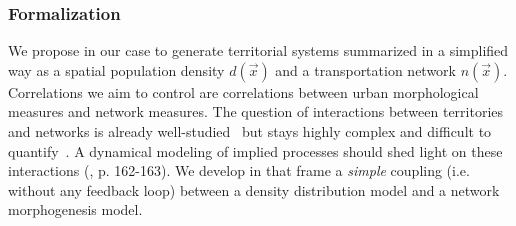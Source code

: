 

\subsubsection{Formalization}

We propose in our case to generate territorial systems summarized in a simplified way as a spatial population density $d(\vec{x})$ and a transportation network $n(\vec{x})$. Correlations we aim to control are correlations between urban morphological measures and network measures. The question of interactions between territories and networks is already well-studied~\cite{offner1996reseaux} but stays highly complex and difficult to quantify~\cite{offner1993effets}. A dynamical modeling of implied processes should shed light on these interactions (\cite{bretagnolle:tel-00459720}, p. 162-163). We develop in that frame a \emph{simple} coupling (i.e. without any feedback loop) between a density distribution model and a network morphogenesis model.

